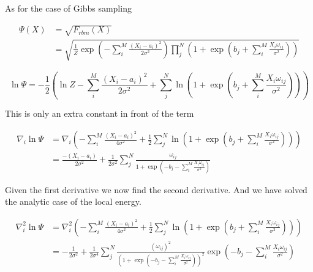 As for the case of Gibbs sampling

\begin{align*}
\Psi(X) &= \sqrt{F_{rbm}(X)} \\
&= \sqrt{\frac{1}{Z} \exp \left( -\sum_{i}^{M} \frac{(X_i - a_i)^2}{2 \sigma^2} \right) \prod_{j}^{N} \left( 1 + \exp \left( b_j + \sum_{i}^{M} \frac{X_i \omega_{ij}}{\sigma^2} \right) \right)}
\end{align*}


\begin{equation*}
\ln \Psi = -\frac{1}{2} \left( \ln Z - \sum_{i}^{M} \frac{(X_i - a_i)^2}{2 \sigma^2} +  \sum_{j}^{N} \ln \left(1 + \exp \left( b_j + \sum_{i}^{M} \frac{X_i \omega_{ij}}{\sigma^2} \right) \right) \right)
\end{equation*}

This is only an extra constant in front of the term

\begin{align*}
\nabla_i \ln \Psi &= \nabla_i \left( - \sum_{i}^{M} \frac{(X_i - a_i)^2}{4 \sigma^2} +  \frac{1}{2} \sum_{j}^{N} \ln \left( 1 + \exp \left( b_j + \sum_{i}^{M} \frac{X_i \omega_{ij}}{\sigma^2} \right) \right) \right) \\
&= \frac{-(X_i - a_i)}{2\sigma^2} + \frac{1}{2\sigma^2}\sum_{j}^{N} \frac{\omega_{ij}}{1 + \exp \left( -b_j - \sum_{i}^{M} \frac{X_i \omega_{ij}}{\sigma^2} \right)}
\end{align*}

Given the first derivative we now find the second derivative. And we have solved the analytic case of the local energy.

\begin{align*}
\nabla_i^2 \ln \Psi &= \nabla_i^2 \left( - \sum_{i}^{M} \frac{(X_i - a_i)^2}{4 \sigma^2} +  \frac{1}{2} \sum_{j}^{N} \ln \left( 1 + \exp \left( b_j + \sum_{i}^{M} \frac{X_i \omega_{ij}}{\sigma^2} \right) \right) \right) \\
&= -\frac{1}{2\sigma^2} + \frac{1}{2\sigma^4} \sum_{j}^{N} \frac{\left(\omega_{ij}\right)^2  }{\left(1 + \exp \left( -b_j - \sum_{i}^{M} \frac{X_i \omega_{ij}}{\sigma^2} \right)\right)^2}\exp \left( -b_j - \sum_{i}^{M} \frac{X_i \omega_{ij}}{\sigma^2} \right) 
\end{align*}

